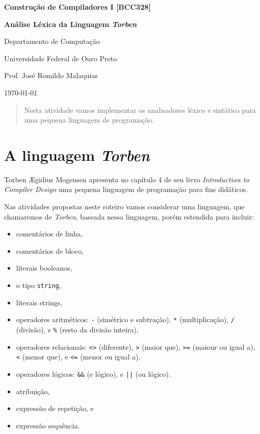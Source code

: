 \documentclass[a4paper,10pt,brazil]{article}
\newcommand{\lang}{\textsl{Torben}}
\begin{document}
\begin{center}
  \textbf{Construção de Compiladores I [BCC328]}
\end{center}
\begin{tcolorbox}[center title,colbacktitle=yellow!20,coltitle=blue,fonttitle=\scshape,title=\textbf{\textsf{Atividade Prática}}]
  \begin{center}
    \textbf{\Large Análise Léxica da Linguagem \lang{}}
  \end{center}
\end{tcolorbox}
\begin{center}
  Departamento de Computação\par
  Universidade Federal de Ouro Preto\par
  Prof. José Romildo Malaquias\par
  \today
\end{center}

\begin{abstract}
  Nesta atividade vamos implementar os analisadores léxico e sintático
  para uma pequena linguagem de programação.
\end{abstract}

\tableofcontents

\section{A linguagem \lang{}}

Torben Ægidius Mogensen apresenta no capítulo 4 de seu livro
\textsl{Introduction to Compiler Design} uma pequena linguagem de
programação para fins didáticos.

Nas atividades propostas neste roteiro vamos considerar uma linguagem,
que chamaremos de \lang{}, baseada nessa linguagem, porém estendida para
incluir:
\begin{itemize}
  \item comentários de linha,
  \item comentários de bloco,
  \item literais booleanos,
  \item o tipo \texttt{string},
  \item literais strings,
  \item operadores aritméticos: \texttt{-} (simétrico e subtração),
  \texttt{*} (multiplicação), \texttt{/} (divisão), e \texttt{\%}
  (resto da divisão inteira),
  \item operadores relacionais: \texttt{<>} (diferente), \texttt{>}
  (maior que), \texttt{>=} (maiour ou igual a), \texttt{<} (menor que),
  e \texttt{<=} (menor ou igual a),
  \item operadores lógicos: \texttt{\&\&} (e lógico), e \texttt{||} (ou
  lógico).
  \item atribuição,
  \item expressão de repetição, e
  \item expressão sequência.
\end{itemize}
\end{document}

